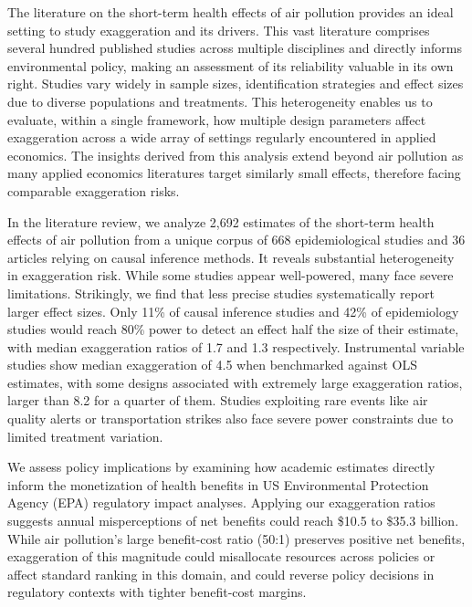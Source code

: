 \documentclass[12pt]{article}
\begin{document}
		The literature on the short-term health effects of air pollution provides an ideal setting to study exaggeration and its drivers. This vast literature comprises several hundred published studies across multiple disciplines and directly informs environmental policy, making an assessment of its reliability valuable in its own right. Studies vary widely in sample sizes, identification strategies and effect sizes due to diverse populations and treatments. This heterogeneity enables us to evaluate, within a single framework, how multiple design parameters affect exaggeration across a wide array of settings regularly encountered in applied economics. The insights derived from this analysis extend beyond air pollution as many applied economics literatures target similarly small effects, therefore facing comparable exaggeration risks.
		
		In the literature review, we analyze 2,692 estimates of the short-term health effects of air pollution from a unique corpus of 668 epidemiological studies and 36 articles relying on causal inference methods. It reveals substantial heterogeneity in exaggeration risk. While some studies appear well-powered, many face severe limitations. Strikingly, we find that less precise studies systematically report larger effect sizes. Only 11\% of causal inference studies and 42\% of epidemiology studies would reach 80\% power to detect an effect half the size of their estimate, with median exaggeration ratios of 1.7 and 1.3 respectively. Instrumental variable studies show median exaggeration of 4.5 when benchmarked against OLS estimates, with some designs associated with extremely large exaggeration ratios, larger than 8.2 for a quarter of them. Studies exploiting rare events like air quality alerts or transportation strikes also face severe power constraints due to limited treatment variation.
		
		We assess policy implications by examining how academic estimates directly inform the monetization of health benefits in US Environmental Protection Agency (EPA) regulatory impact analyses. Applying our exaggeration ratios suggests annual misperceptions of net benefits could reach \$10.5 to \$35.3 billion. While air pollution's large benefit-cost ratio (50:1) preserves positive net benefits, exaggeration of this magnitude could misallocate resources across policies or affect standard ranking in this domain, and could reverse policy decisions in regulatory contexts with tighter benefit-cost margins.
		
\end{document}
